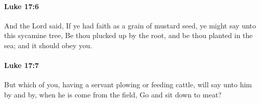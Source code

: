		\paragraph{Luke 17:6} %
			\label{LUKE-17-6}

			And the Lord said, If ye had faith as a grain of mustard seed, ye might say unto this sycamine tree, Be thou plucked up by the root, and be thou planted in the sea; and it should obey you.

			\begin{framed}
			\scriptsize
				\begin{compactdesc}
					\item[SBLG] 
				\end{compactdesc}
			\end{framed}

		\paragraph{Luke 17:7} %
			\label{LUKE-17-7}

			But which of you, having a servant plowing or feeding cattle, will say unto him by and by, when he is come from the field, Go and sit down to meat?

